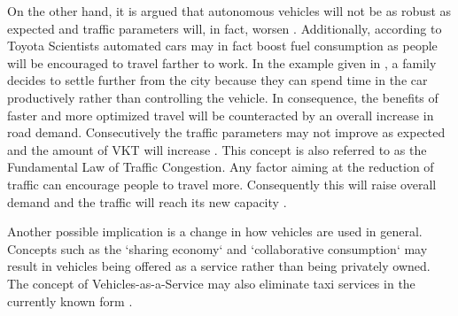 \documentclass[11pt,english]{article}
\begin{document}
On the other hand, it is argued that autonomous vehicles will not be as robust as expected and traffic parameters will, in fact, worsen \citep{sivak2015road}. Additionally, according to Toyota Scientists \citep{toyota1} automated cars may in fact boost fuel consumption as people will be encouraged to travel farther to work. In the example given in \citet{litman2014autonomous}, a family decides to settle further from the city because they can spend time in the car productively rather than controlling the vehicle. In consequence, the benefits of faster and more optimized travel will be counteracted by an overall increase in road demand. Consecutively the traffic parameters may not improve as expected and the amount of VKT will increase \citep{litman2014autonomous}. This concept is also referred to as the Fundamental Law of Traffic Congestion. Any factor aiming at the reduction of traffic can encourage people to travel more. Consequently this will raise overall demand and the traffic will reach its new capacity \citep{duranton2011fundamental}.

\par
Another possible implication is a change in how vehicles are used in general. Concepts such as the `sharing economy` and `collaborative consumption` may result in vehicles being offered as a service rather than being privately owned. The concept of Vehicles-as-a-Service may also eliminate taxi services in the currently known form  \citep{levinson2015climbing}.

















\end{document}
